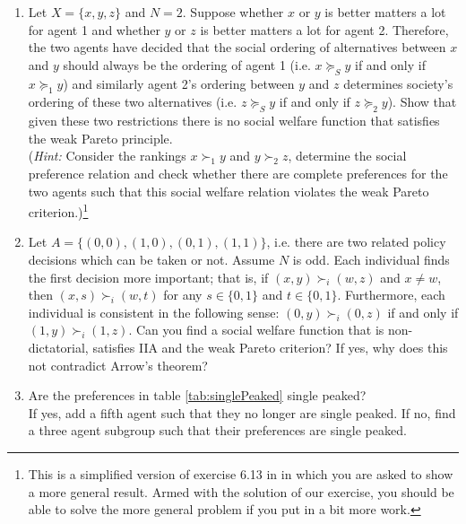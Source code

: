 \documentclass[a4paper,12pt]{article}
\begin{document}
\begin{enumerate}
\item Let $X=\{x,y,z\}$ and $N=2$. Suppose whether $x$ or $y$ is better matters a lot for agent 1 and whether $y$ or $z$ is better matters a lot for agent 2. Therefore, the two agents have decided that the social ordering of alternatives between $x$ and $y$ should always be the ordering of agent 1 (i.e. $x\succeq_S y$ if and only if $x\succeq_1 y$) and similarly agent 2's ordering between $y$ and $z$ determines society's ordering of these two alternatives (i.e. $z\succeq_S y$ if and only if $z\succeq_2 y$). Show that given these two restrictions there is no social welfare function that satisfies the weak Pareto principle.\\(\emph{Hint: }Consider the rankings $x\succ_1 y$ and $y\succ_2 z$, determine the social preference relation and check whether there are complete preferences for the two agents such that this social welfare relation violates the weak Pareto criterion.)\footnote{This is a simplified version of exercise 6.13 in \cite{jehle2001advanced} in which you are asked to show a more general result. Armed with the solution of our exercise, you should be able to solve the more general problem if you put in a bit more work.}
  \item Let $A=\{(0,0),(1,0),(0,1),(1,1)\}$, i.e. there are two related policy decisions which can be taken or not. Assume $N$ is odd. Each individual finds the first decision more important; that is, if $(x,y)\succ_i (w,z)$ and $x\neq w$, then $(x,s)\succ_i (w,t)$ for any $s\in\{0,1\}$ and $t\in\{0,1\}$. Furthermore, each individual is consistent in the following sense:  $(0,y)\succ_i (0,z)$ if and only if $(1,y)\succ_i (1,z)$. Can you find a social welfare function that is non-dictatorial, satisfies IIA and the weak Pareto criterion? If yes, why does this not contradict Arrow's theorem? 
\item Are the preferences in table \ref{tab:singlePeaked} single peaked?\\ If yes, add a fifth agent such that they no longer are single peaked. If no, find a three agent subgroup such that their preferences are single peaked. 

\end{enumerate}
\end{document}
